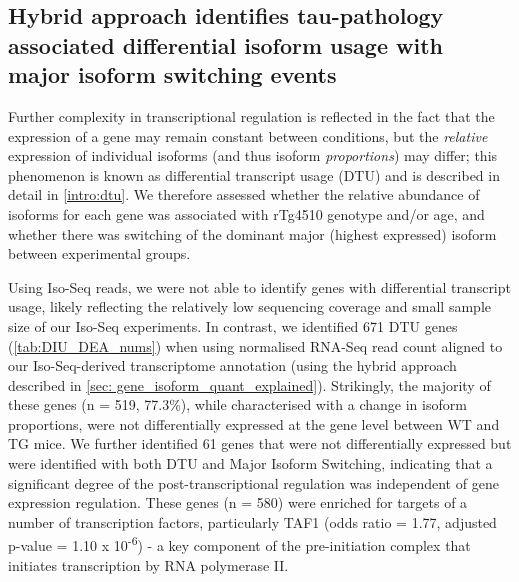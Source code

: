 \clearpage
\subsection{Hybrid approach identifies tau-pathology associated differential isoform usage with major isoform switching events}
Further complexity in transcriptional regulation is reflected in the fact that the expression of a gene may remain constant between conditions, but the \textit{relative} expression of individual isoforms (and thus isoform \textit{proportions}) may differ; this phenomenon is known as differential transcript usage (DTU) and is described in detail in \cref{intro:dtu}. We therefore assessed whether the relative abundance of isoforms for each gene was associated with rTg4510 genotype and/or age, and whether there was switching of the dominant major (highest expressed) isoform between experimental groups. 

Using Iso-Seq reads, we were not able to identify genes with differential transcript usage, likely reflecting the relatively low sequencing coverage and small sample size of our Iso-Seq experiments. In contrast, we identified 671 DTU genes (\cref{tab:DIU_DEA_nums}) when using normalised RNA-Seq read count aligned to our Iso-Seq-derived transcriptome annotation (using the hybrid approach described in \cref{sec: gene_isoform_quant_explained}). Strikingly, the majority of these genes (n = 519, 77.3\%), while characterised with a change in isoform proportions, were not differentially expressed at the gene level between WT and TG mice. We further identified 61 genes that were not differentially expressed but were identified with both DTU and Major Isoform Switching, indicating that a significant degree of the post-transcriptional regulation was independent of gene expression regulation. These genes (n = 580) were enriched for targets of a number of transcription factors, particularly TAF1 (odds ratio = 1.77, adjusted p-value = 1.10 x 10\textsuperscript{-6}) - a key component of the pre-initiation complex that initiates transcription by RNA polymerase II\cite{Bieniossek2013}. 

